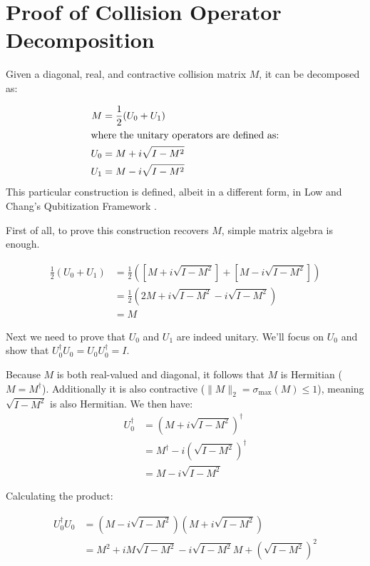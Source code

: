 \section{Proof of Collision Operator Decomposition}
\label{app:collision_lcu}

Given a diagonal, real, and contractive collision matrix $M$, it can be decomposed as:

\begin{align*}
    M &= \frac{1}{2}(U_0 + U_1) \\
    \intertext{where the unitary operators are defined as:}
    U_0 &= M + i\sqrt{I - M^2} \\
    U_1 &= M - i\sqrt{I - M^2}
\end{align*}
This particular construction is defined, albeit in a different form, in Low and Chang's Qubitization Framework \cite{low2019hamiltonian}.

First of all, to prove this construction recovers $M$, simple matrix algebra is enough.

\begin{align*}
    \frac{1}{2}(U_0 + U_1) &= \frac{1}{2} \left( \left[M + i\sqrt{I - M^2}\right] + \left[M - i\sqrt{I - M^2}\right] \right) \\
    &= \frac{1}{2} \left( 2M + i\sqrt{I - M^2} - i\sqrt{I - M^2} \right) \\
    &= M
\end{align*}

Next we need to prove that $U_0$ and $U_1$ are indeed unitary.
We'll focus on $U_0$ and show that $U_0^\dagger U_0 = U_0 U_0^\dagger = I$.

Because $M$ is both real-valued and diagonal, it follows that $M$ is Hermitian ($M = M^\dagger$).
Additionally it is also contractive ($\|M\|_2 = \sigma_{\max}(M) \le 1$), meaning $\sqrt{I-M^2}$ is also Hermitian.
We then have:
\begin{align*}
    U_0^\dagger &= (M + i\sqrt{I-M^2})^\dagger \\
    &= M^\dagger - i(\sqrt{I - M^2})^\dagger \\
    &= M - i\sqrt{I - M^2}
\end{align*}

Calculating the product:

\begin{align*}
    U_0^\dagger U_0 &= \left( M - i\sqrt{I - M^2} \right) \left( M + i\sqrt{I - M^2} \right) \\
    &= M^2 + iM\sqrt{I - M^2} - i\sqrt{I - M^2}M + \left( \sqrt{I - M^2} \right)^2
\end{align*}

